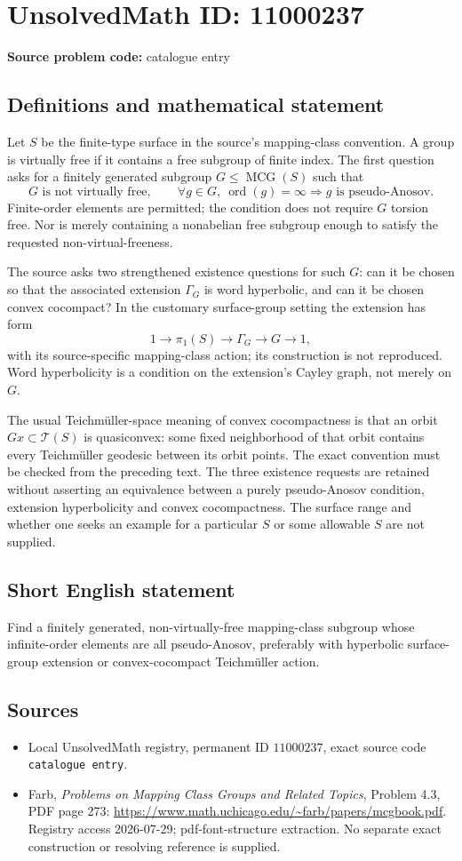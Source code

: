 \documentclass[11pt]{article}
\begin{document}
\section*{UnsolvedMath ID: 11000237}
\textbf{Source problem code:} catalogue entry
\subsection{Definitions and mathematical statement}
Let \(S\) be the finite-type surface in the source's mapping-class convention. A group is virtually free if it contains a free subgroup of finite index. The first question asks for a finitely generated subgroup \(G\leq\operatorname{MCG}(S)\) such that
\[G\text{ is not virtually free},\qquad
\forall g\in G,\ \operatorname{ord}(g)=\infty\Longrightarrow g\text{ is pseudo-Anosov}.\]
Finite-order elements are permitted; the condition does not require \(G\) torsion free. Nor is merely containing a nonabelian free subgroup enough to satisfy the requested non-virtual-freeness.

The source asks two strengthened existence questions for such \(G\): can it be chosen so that the associated extension \(\Gamma_G\) is word hyperbolic, and can it be chosen convex cocompact? In the customary surface-group setting the extension has form
\[1\longrightarrow\pi_1(S)\longrightarrow\Gamma_G\longrightarrow G\longrightarrow1,\]
with its source-specific mapping-class action; its construction is not reproduced. Word hyperbolicity is a condition on the extension's Cayley graph, not merely on \(G\).

The usual Teichm\"uller-space meaning of convex cocompactness is that an orbit \(Gx\subset\mathcal T(S)\) is quasiconvex: some fixed neighborhood of that orbit contains every Teichm\"uller geodesic between its orbit points. The exact convention must be checked from the preceding text. The three existence requests are retained without asserting an equivalence between a purely pseudo-Anosov condition, extension hyperbolicity and convex cocompactness. The surface range and whether one seeks an example for a particular \(S\) or some allowable \(S\) are not supplied.
\subsection{Short English statement}
Find a finitely generated, non-virtually-free mapping-class subgroup whose infinite-order elements are all pseudo-Anosov, preferably with hyperbolic surface-group extension or convex-cocompact Teichm\"uller action.
\subsection{Sources}
\begin{itemize}
\item Local UnsolvedMath registry, permanent ID \(11000237\), exact source code \texttt{catalogue entry}.
\item Farb, \emph{Problems on Mapping Class Groups and Related Topics}, Problem 4.3, PDF page 273: \url{https://www.math.uchicago.edu/~farb/papers/mcgbook.pdf}. Registry access 2026-07-29; pdf-font-structure extraction. No separate exact construction or resolving reference is supplied.
\end{itemize}
\end{document}
